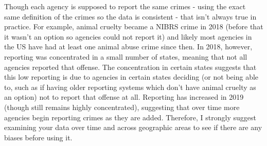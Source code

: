 \documentclass[
  12pt,
  openany]{book}
\begin{document}
Though each agency is supposed to report the same crimes - using the exact same definition of the crimes so the data is consistent - that isn't always true in practice. For example, animal cruelty became a NIBRS crime in 2018 (before that it wasn't an option so agencies could not report it) and likely most agencies in the US have had at least one animal abuse crime since then. In 2018, however, reporting was concentrated in a small number of states, meaning that not all agencies reported that offense. The concentration in certain states suggests that this low reporting is due to agencies in certain states deciding (or not being able to, such as if having older reporting systems which don't have animal cruelty as an option) not to report that offense at all. Reporting has increased in 2019 (though still remains highly concentrated), suggesting that over time more agencies begin reporting crimes as they are added. Therefore, I strongly suggest examining your data over time and across geographic areas to see if there are any biases before using it.
\end{document}
